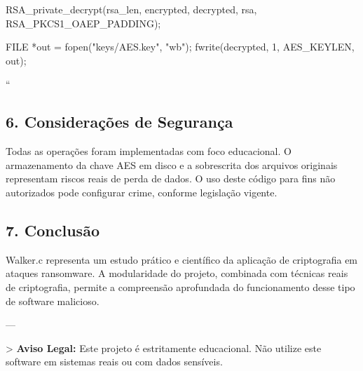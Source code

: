 \documentclass[a4paper,12pt]{article}
\begin{document}
\begin{itemize}
{{    RSA_private_decrypt(rsa_len, encrypted, decrypted, rsa, RSA_PKCS1_OAEP_PADDING);

    FILE *out = fopen("keys/AES.key", "wb");
    fwrite(decrypted, 1, AES_KEYLEN, out);
}
}``

\subsection*{6. Considerações de Segurança}

Todas as operações foram implementadas com foco educacional. O armazenamento da chave AES em disco e a sobrescrita dos arquivos originais representam riscos reais de perda de dados. O uso deste código para fins não autorizados pode configurar crime, conforme legislação vigente.

\subsection*{7. Conclusão}

Walker.c representa um estudo prático e científico da aplicação de criptografia em ataques ransomware. A modularidade do projeto, combinada com técnicas reais de criptografia, permite a compreensão aprofundada do funcionamento desse tipo de software malicioso. 

---

> \textbf{Aviso Legal:} Este projeto é estritamente educacional. Não utilize este software em sistemas reais ou com dados sensíveis.

\end{itemize}
\end{document}
